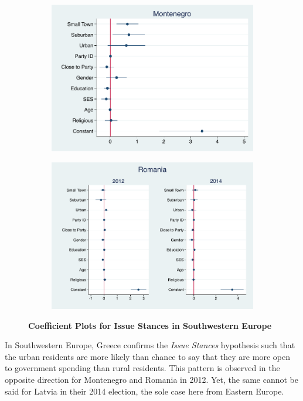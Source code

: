\documentclass[12pt, titlepage]{article}
\newcommand\e{\emph}
\newcommand\tb{\textbf}
\begin{document}
\begin{figure}[H]
\begin{subfigure}[b]{0.475\textwidth}
		\includegraphics[width=\textwidth]{LibCoef/Montenegro}
	\end{subfigure}
	\quad
	\begin{subfigure}[b]{0.475\textwidth}   
		\centering 
		\includegraphics[width=\textwidth]{LibCoef/Romania}
	\end{subfigure}
	\caption[ \tb{Issue Stances - Southwestern Europe} ]
	{\tb {Coefficient Plots for Issue Stances in Southwestern Europe} }
	\label{SWEuro}
\end{figure}

In Southwestern Europe, Greece confirms the \e{Issue Stances} hypothesis such that the urban residents are more likely than chance to say that they are more open to government spending than rural residents. This pattern is observed in the opposite direction for Montenegro and Romania in 2012. Yet, the same cannot be said for Latvia in their 2014 election, the sole case here from Eastern Europe. 
\end{document}
